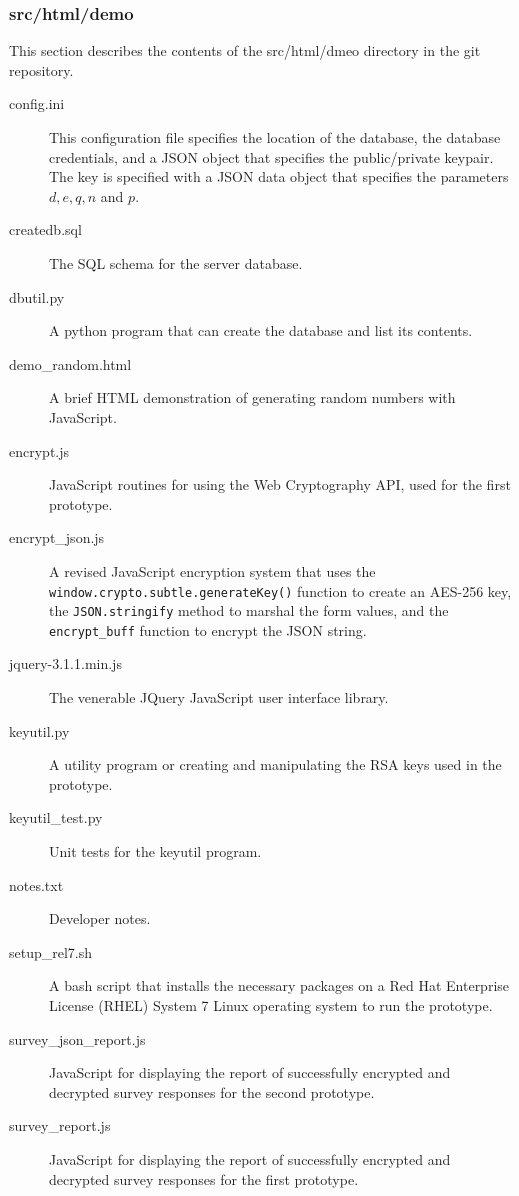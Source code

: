 \documentclass[fleqn,10pt]{wlscirep}
\begin{document}
\subsubsection{src/html/demo}
This section describes the contents of the src/html/dmeo directory in
the git repository.

\begin{description}
  \item[config.ini] This configuration file specifies the location of
    the database, the database credentials, and a JSON object that
    specifies the public/private keypair. The key is specified with a
    JSON data object that specifies the parameters $d, e, q, n$ and $p$.
  \item[createdb.sql] The SQL schema for the server database.
  \item[dbutil.py] A python program that can create the database and
    list its contents.
  \item[demo\_random.html] A brief HTML demonstration of generating
    random numbers with JavaScript.
  \item[encrypt.js] JavaScript routines for using the Web Cryptography
    API, used for the first prototype.
  \item[encrypt\_json.js] A revised JavaScript encryption system that
    uses the \verb|window.crypto.subtle.generateKey()| function to
    create an AES-256 key, the \verb|JSON.stringify| method to marshal
    the form values, and the \verb|encrypt_buff| function to encrypt
    the JSON string.
  \item[jquery-3.1.1.min.js] The venerable JQuery JavaScript user
    interface library.
  \item[keyutil.py] A utility program or creating and manipulating
    the RSA keys used in the prototype.
  \item[keyutil\_test.py] Unit tests for the keyutil program.
  \item[notes.txt] Developer notes.
  \item[setup\_rel7.sh] A bash script that installs the necessary
    packages on a Red Hat Enterprise License (RHEL) System 7 Linux
    operating system to run the prototype.
  \item[survey\_json\_report.js] JavaScript for displaying the
      report of successfully encrypted and decrypted survey responses
      for the second prototype.
  \item[survey\_report.js] JavaScript for displaying the
      report of successfully encrypted and decrypted survey responses
      for the first prototype.
\end{description}
\end{document}
